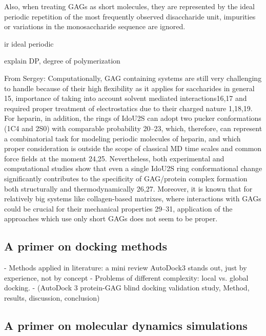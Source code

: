 Also, when treating GAGs as short molecules, they are represented by the ideal
periodic repetition of the most frequently observed disaccharide unit,
impurities or variations in the monosaccharide sequence are ignored.

ir ideal periodic

explain DP, degree of polymerization



From Sergey: Computationally, GAG containing systems are still very challenging
to handle because of their high flexibility as it applies for saccharides in
general 15, importance of taking into account solvent mediated interactions16,17
and required proper treatment of electrostatics due to their charged nature
1,18,19. For heparin, in addition, the rings of IdoU2S can adopt two pucker
conformations (1C4 and 2S0) with comparable probability 20–23, which, therefore,
can represent a combinatorial task for modeling periodic molecules of heparin,
and which proper consideration is outside the scope of classical MD time scales
and common force fields at the moment 24,25. Nevertheless, both experimental and
computational studies show that even a single IdoU2S ring conformational change
significantly contributes to the specificity of GAG/protein complex formation
both structurally and thermodynamically 26,27. Moreover, it is known
that for relatively big systems like collagen-based matrixes, where interactions
with GAGs could be crucial for their mechanical properties 29–31, application of
the approaches which use only short GAGs does not seem to be proper.



\subsection{A primer on docking methods}


    - Methods applied in literature: a mini review
        AutoDock3 stands out, just by experience, not by concept
    - Problems of different complexity: local vs. global docking.
    - (AutoDock 3 protein-GAG blind docking validation study,
        Method, results, discussion, conclusion)

\lipsum[1-5]

\subsection{A primer on molecular dynamics simulations}

\lipsum[1-5]


